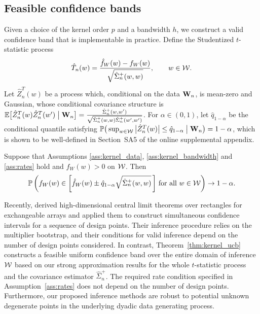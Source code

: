 \subsection{Feasible confidence bands}
\label{sec:feasible_confidence_bands}

Given a choice of the kernel order $p$
and a bandwidth $h$, we construct a valid confidence
band that is implementable in practice.
Define the Studentized $t$-statistic process
%
\[ \hat T_n(w) = \frac{\hat{f}_W(w) - f_W(w)}{\sqrt{\hat
\Sigma_n^+(w,w)}} , \qquad w\in\mathcal{W}.\]
%
Let $\hat Z_n^T(w)$ be a process which,
conditional on the data $\mathbf{W}_n$,
is mean-zero and Gaussian, whose
conditional covariance structure is
$\mathbb{E}\big[ \hat Z_n^T(w) \hat Z_n^T(w') \bigm\vert \mathbf{W}_n \big]
= \frac{\hat \Sigma_n^+(w,w')}
{\sqrt{\hat \Sigma_n^+(w,w) \hat \Sigma_n^+(w',w')}}$.
For $\alpha \in (0,1)$, let $\hat q_{1-\alpha}$ be the
conditional quantile satisfying
%
$ \mathbb{P}\big(\sup_{w \in \mathcal{W}}
  \big| \hat Z_n^T(w) \big|
  \leq \hat q_{1-\alpha}
\bigm\vert \mathbf{W}_n \big)
= 1 - \alpha$,
%
which is shown to be well-defined in
Section~SA5 of
the online supplemental appendix.

\begin{theorem}
  \label{thm:kernel_ucb}

  Suppose that Assumptions \ref{ass:kernel_data}, \ref{ass:kernel_bandwidth}
  and \ref{ass:rates} hold and $f_W(w) > 0$ on $\mathcal{W}$. Then
  \begin{align*}
    \mathbb{P}\left(
      f_W(w)
      \in
      \left[
        \hat f_W(w)
        \pm
        \hat q_{1-\alpha}
        \sqrt{\hat\Sigma_n^+(w,w)}
      \,\right]
      \,\textup{for all }
      w \in \mathcal{W}
    \right)
    \to 1 - \alpha.
  \end{align*}
\end{theorem}

Recently, \citet{chiang2022inference} derived high-dimensional central limit
theorems over rectangles for exchangeable arrays and applied them to construct
simultaneous confidence intervals for a sequence of design points. Their
inference procedure relies on the multiplier bootstrap,
and their conditions for valid inference
depend on the number of design points considered.
In contrast, Theorem~\ref{thm:kernel_ucb} constructs a feasible uniform
confidence band
over the entire domain of inference $\mathcal{W}$ based on our strong
approximation results for the whole $t$-statistic process
and the covariance estimator $\hat\Sigma_n^+$.
The required rate condition specified in
Assumption~\ref{ass:rates} does not depend on the number of design points.
Furthermore, our proposed inference methods are robust to potential
unknown degenerate points in the underlying dyadic data generating process.

